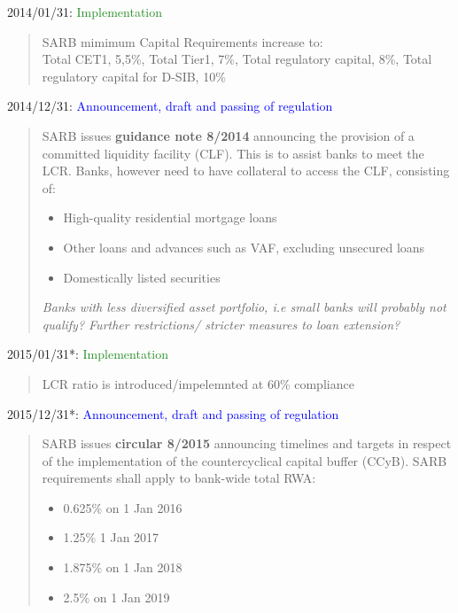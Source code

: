 \documentclass[
  letterpaper,
  DIV=11,
  numbers=noendperiod]{scrartcl}
\begin{document}
2014/01/31: \textcolor{ForestGreen}{Implementation}

\begin{quote}
SARB mimimum Capital Requirements increase to:\\
Total CET1, 5,5\%, Total Tier1, 7\%, Total regulatory capital, 8\%, Total regulatory capital for D-SIB, 10\%
\end{quote}

2014/12/31:
\textcolor{blue}{Announcement, draft and passing of regulation}

\begin{quote}
SARB issues \textbf{guidance note 8/2014} announcing  the provision of a committed liquidity facility  (CLF). This is to assist banks to meet the LCR.
Banks, however need to have collateral to access the CLF, consisting of:
\begin{itemize}
    \item  High-quality residential mortgage loans
\item Other loans and advances such as VAF, excluding unsecured loans
\item Domestically listed securities
\end{itemize}
\textit{Banks with less diversified asset portfolio, i.e small banks will probably not qualify? Further restrictions/ stricter measures to loan extension?}
\end{quote}

2015/01/31*: \textcolor{ForestGreen}{Implementation}

\begin{quote}
LCR ratio is introduced/impelemnted at 60\% compliance
\end{quote}

2015/12/31*:
\textcolor{blue}{Announcement, draft and passing of regulation}

\begin{quote}

SARB issues \textbf{circular 8/2015} announcing timelines and targets in respect of  the implementation of the countercyclical capital buffer (CCyB). SARB requirements shall apply to bank-wide total RWA:
\begin{itemize}
    \item 0.625\% on 1 Jan 2016
\item 1.25\% 1 Jan 2017
\item 1.875\% on 1 Jan 2018
\item 2.5\% on 1 Jan 2019
\end{itemize}
\end{quote}
\end{document}
